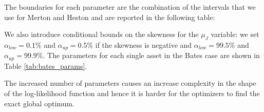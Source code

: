 The boundaries for each parameter are the combination of the intervals that we use for Merton and Heston and are reported in the following table:

\bigskip 

\begin{center}
	\noindent{}
\end{center}

\bigskip

We also introduce conditional bounds on the skewness for the $\mu_J$ variable: we set $\alpha_{low} = 0.1\%$ and $\alpha_{up} = 0.5\%$ if the skewness is negative and $\alpha_{low} = 99.5\%$ and $\alpha_{up} = 99.9\%$.
The parameters for each single asset in the Bates case are shown in Table \ref{tab:bates_params}.

The increased number of parameters causes an increase complexity in the shape of the log-likelihood function and hence it is harder for the optimizers to find the exact global optimum.



